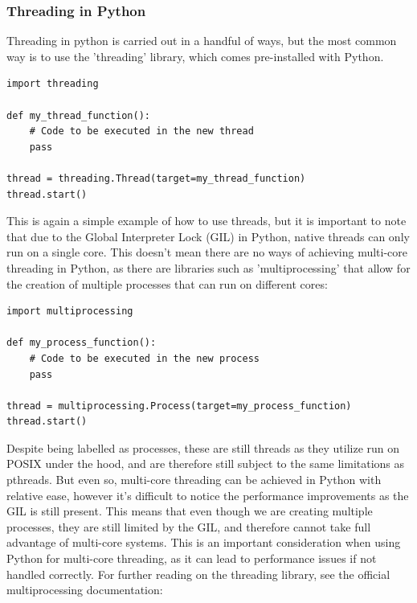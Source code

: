 \documentclass[12pt,a4paper]{article}
\begin{document}
\subsubsection{Threading in Python}

Threading in python is carried out in a handful of ways, but the most common way is to use the 'threading' library\parencite{PythonThreading}, which comes pre-installed with Python. 

\begin{verbatim}
import threading

def my_thread_function():
    # Code to be executed in the new thread
    pass

thread = threading.Thread(target=my_thread_function)
thread.start()
\end{verbatim}

This is again a simple example of how to use threads, but it is important to note that due to the Global Interpreter Lock (GIL) in Python, native threads can only run on a single core\parencite{PythonGIL}. This doesn't mean there are no ways of achieving multi-core threading in Python, as there are libraries such as 'multiprocessing' that allow for the creation of multiple processes that can run on different cores:

\begin{verbatim}
import multiprocessing

def my_process_function():
    # Code to be executed in the new process
    pass

thread = multiprocessing.Process(target=my_process_function)
thread.start()
\end{verbatim}

Despite being labelled as processes, these are still threads as they utilize run on POSIX under the hood\parencite{PythonMultiprocessing}, and are therefore still subject to the same limitations as pthreads. But even so, multi-core threading can be achieved in Python with relative ease, however it's difficult to notice the performance improvements as the GIL is still present\parencite{PythonGIL}. This means that even though we are creating multiple processes, they are still limited by the GIL, and therefore cannot take full advantage of multi-core systems. This is an important consideration when using Python for multi-core threading, as it can lead to performance issues if not handled correctly. For further reading on the threading library, see the official multiprocessing documentation: 
\end{document}

